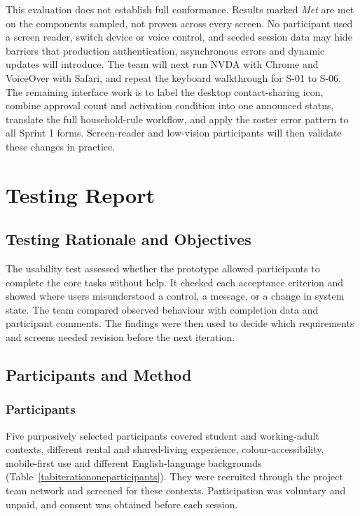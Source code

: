 \documentclass[11pt,a4paper]{article}
\begin{document}
This evaluation does not establish full conformance. Results marked
\textit{Met} are met on the components sampled, not proven across every
screen. No participant used a screen reader, switch device or voice control,
and seeded session data may hide barriers that production authentication,
asynchronous errors and dynamic updates will introduce. The team will next run
NVDA with Chrome and VoiceOver with Safari, and repeat the keyboard walkthrough for S-01 to S-06. The
remaining interface work is to label the desktop contact-sharing icon, combine
approval count and activation condition into one announced status, translate
the full household-rule workflow, and apply the roster error pattern to all
Sprint 1 forms. Screen-reader and low-vision participants will then validate
these changes in practice.

\section{Testing Report}
\label{sectestingreport}

\subsection{Testing Rationale and Objectives}
\label{subsectestingrationale}

The usability test assessed whether the prototype allowed participants to
complete the core tasks without help. It checked each acceptance criterion and
showed where users misunderstood a control, a message, or a change in system
state. The team compared observed behaviour with completion data and participant
comments. The findings were then used to decide which requirements and screens
needed revision before the next iteration.

\subsection{Participants and Method}
\label{subsectestingmethod}

\subsubsection{Participants}

Five purposively selected participants covered student and working-adult
contexts, different rental and shared-living experience, colour-accessibility,
mobile-first use and different English-language backgrounds
(Table~\ref{tabiterationoneparticipants}). They were recruited through the
project team network and screened for these contexts. Participation was
voluntary and unpaid, and consent was obtained before each session.
\end{document}
